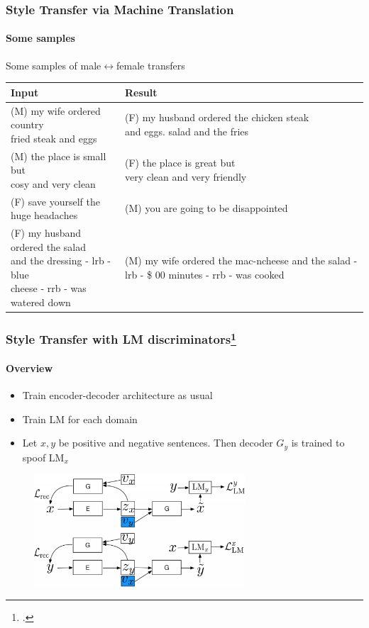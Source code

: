 \documentclass[10pt]{beamer}
\begin{document}
\begin{frame}
\frametitle{Style Transfer via Machine Translation}
\framesubtitle{Some samples}

Some samples of male$\leftrightarrow$female transfers
\begin{table}[]
\small
\begin{tabular}{p{5cm}|p{5cm}}
Input & Result \\
\hline
(M) \makecell[l]{my wife ordered country \\ fried steak and eggs} & (F) \makecell[l]{my husband ordered the chicken steak \\ and eggs. salad and the fries} \\
(M) \makecell[l]{the place is small but \\ cosy and very clean} & \makecell[l]{(F) the place is great but \\ very clean and very friendly} \\
(F) save yourself the huge headaches  & (M) you are going to be disappointed  \\
(F) \makecell[l]{my husband ordered the salad \\ and the dressing - lrb - blue \\ cheese - rrb - was watered down} & \makecell[l]{(M) my wife ordered the mac-ncheese \\ and the salad - lrb - \$ \\ 00 minutes - rrb - was cooked}
\end{tabular}
\end{table}

\end{frame}


\begin{frame}
\frametitle{Style Transfer with LM discriminators\footcite{StyleTransferWithLMDiscriminators}}
\framesubtitle{Overview}
\begin{itemize}
    \item Train encoder-decoder architecture as usual
    \item Train LM for each domain
    \item Let $x, y$ be positive and negative sentences. Then decoder $G_y$ is trained to spoof $\text{LM}_x$
\end{itemize}

\begin{figure}
\centering
\includegraphics[width=0.7\textwidth]{images/style-transfer-via-lm-discriminators-architecture}
\end{figure}
\end{frame}
\end{document}
